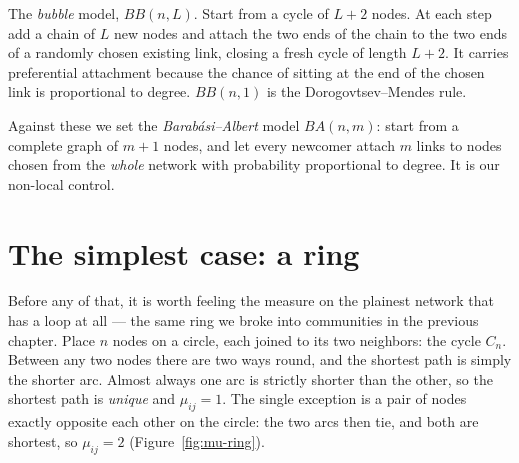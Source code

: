 The \emph{bubble} model, $BB(n,L)$. Start from a cycle of $L+2$ nodes. At each
step add a chain of $L$ new nodes and attach the two ends of the chain to the two
ends of a randomly chosen existing link, closing a fresh cycle of length $L+2$. It
carries preferential attachment because the chance of sitting at the end of the
chosen link is proportional to degree. $BB(n,1)$ is the Dorogovtsev--Mendes rule.

Against these we set the \emph{Barab\'asi--Albert} model $BA(n,m)$: start from a
complete graph of $m+1$ nodes, and let every newcomer attach $m$ links to nodes
chosen from the \emph{whole} network with probability proportional to degree. It
is our non-local control.

\section{The simplest case: a ring}

Before any of that, it is worth feeling the measure on the plainest network that
has a loop at all --- the same ring we broke into communities in the previous
chapter. Place $n$ nodes on a circle, each joined to its two neighbors: the cycle
$C_n$. Between any two nodes there are two ways round, and the shortest path is
simply the shorter arc. Almost always one arc is strictly shorter than the other,
so the shortest path is \emph{unique} and $\mu_{ij}=1$. The single exception is a
pair of nodes exactly opposite each other on the circle: the two arcs then tie, and
both are shortest, so $\mu_{ij}=2$ (Figure~\ref{fig:mu-ring}).

